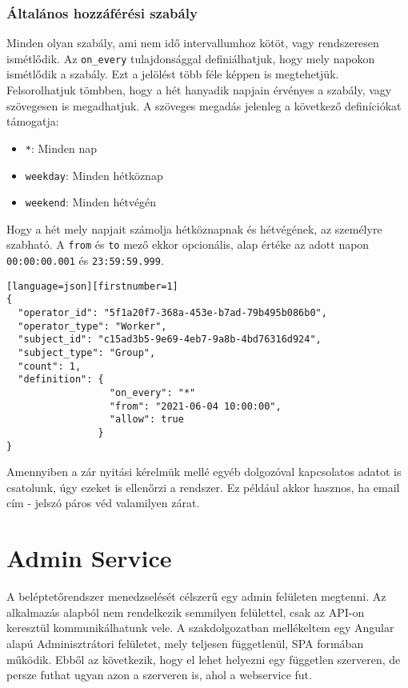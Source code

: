 \documentclass[a4paper,12pt]{thesis-ekf}
\theoremstyle{definition}
\begin{document}
			\subsection{Általános hozzáférési szabály}
				Minden olyan szabály, ami nem idő intervallumhoz kötöt, vagy rendszeresen ismétlődik. Az \texttt{on\_every} tulajdonsággal definiálhatjuk, hogy mely napokon ismétlődik a szabály. Ezt a jelölést több féle képpen is megtehetjük. Felsorolhatjuk tömbben, hogy a hét hanyadik napjain érvényes a szabály, vagy szövegesen is megadhatjuk. A szöveges megadás jelenleg a következő definíciókat támogatja:
				\begin{itemize}
					\item \texttt{*}: Minden nap
					\item \texttt{weekday}: Minden hétköznap
					\item \texttt{weekend}: Minden hétvégén
				\end{itemize}
				Hogy a hét mely napjait számolja hétköznapnak és hétvégének, az személyre szabható. A \texttt{from} és \texttt{to} mező ekkor opcionális, alap értéke az adott napon \texttt{00:00:00.001} és \texttt{23:59:59.999}.
				
				\begin{lstlisting}[caption={Egy példa általános szabály létrehozása}][language=json][firstnumber=1]
{
  "operator_id": "5f1a20f7-368a-453e-b7ad-79b495b086b0",
  "operator_type": "Worker",
  "subject_id": "c15ad3b5-9e69-4eb7-9a8b-4bd76316d924",
  "subject_type": "Group",
  "count": 1,
  "definition": {
                  "on_every": "*"
                  "from": "2021-06-04 10:00:00",
                  "allow": true
                }
}
			\end{lstlisting}
		
			Amennyiben a zár nyitási kérelmük mellé egyéb dolgozóval kapcsolatos adatot is csatolunk, úgy ezeket is ellenőrzi a rendszer. Ez például akkor hasznos, ha email cím - jelszó páros véd valamilyen zárat.
		
	\chapter{Admin Service}
		A beléptetőrendszer menedzselését célszerű egy admin felületen megtenni. Az alkalmazás alapból nem rendelkezik semmilyen felülettel, csak az API-on keresztül kommunikálhatunk vele. A szakdolgozatban mellékeltem egy Angular alapú Adminisztrátori felületet, mely teljesen függetlenül, SPA formában működik. Ebből az következik, hogy el lehet helyezni egy független szerveren, de persze futhat ugyan azon a szerveren is, ahol a webservice fut.
		
\end{document}

